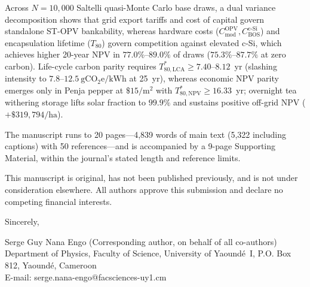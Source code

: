 \documentclass[11pt]{article}
\begin{document}
Across $N=10,000$ Saltelli quasi-Monte Carlo base draws, a dual variance decomposition shows that grid export tariffs and cost of capital govern standalone ST-OPV bankability, whereas hardware costs ($C_{\mathrm{mod}}^{\mathrm{OPV}}, C_{\mathrm{BOS}}^{\mathrm{c\text{-}Si}}$) and encapsulation lifetime ($T_{80}$) govern competition against elevated c-Si, which achieves higher 20-year NPV in $77.0\%$--$89.0\%$ of draws ($75.3\%$--$87.7\%$ at zero carbon). Life-cycle carbon parity requires $T_{80,\mathrm{LCA}}^* \ge 7.40$--$8.12$~yr (slashing intensity to $7.8$--$12.5~\mathrm{gCO_2e/kWh}$ at 25~yr), whereas economic NPV parity emerges only in Penja pepper at $\$15/\mathrm{m}^2$ with $T_{80,\mathrm{NPV}}^* \ge 16.33$~yr; overnight tea withering storage lifts solar fraction to $99.9\%$ and sustains positive off-grid NPV ($+\$319,794/\mathrm{ha}$).

The manuscript runs to 20 pages---4,839 words of main text (5,322 including captions) with 50 references---and is accompanied by a 9-page Supporting Material, within the journal's stated length and reference limits.

This manuscript is original, has not been published previously, and is not under consideration elsewhere. All authors approve this submission and declare no competing financial interests.

\vspace{0.6em}
\noindent
Sincerely,

\vspace{0.5em}
\noindent
Serge Guy Nana Engo (Corresponding author, on behalf of all co-authors)\\
Department of Physics, Faculty of Science, University of Yaound\'e~I, P.O. Box 812, Yaound\'e, Cameroon\\
E-mail: serge.nana-engo@facsciences-uy1.cm
\end{document}
